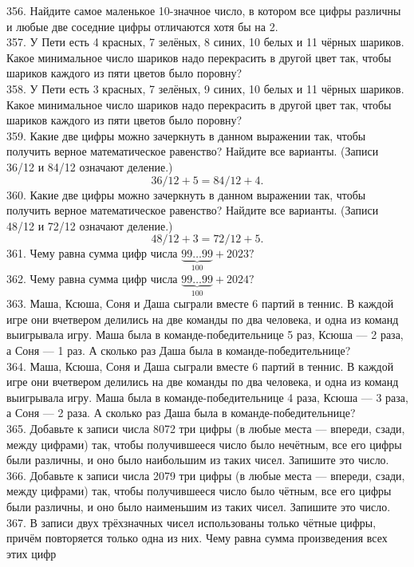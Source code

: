356. Найдите самое маленькое 10-значное число, в котором все цифры различны и любые две соседние цифры отличаются хотя бы на 2.\\
357. У Пети есть 4 красных, 7 зелёных, 8 синих, 10 белых и 11 чёрных шариков. Какое минимальное число шариков надо перекрасить в другой цвет так, чтобы шариков каждого из пяти цветов было поровну?\\
358. У Пети есть 3 красных, 7 зелёных, 9 синих, 10 белых и 11 чёрных шариков. Какое минимальное число шариков надо перекрасить в другой цвет так, чтобы шариков каждого из пяти цветов было поровну?\\
359. Какие две цифры можно зачеркнуть в данном выражении так, чтобы получить верное математическое равенство? Найдите все варианты. (Записи 36/12 и 84/12 означают деление.)
$$ 36/12+5=84/12+4.$$
360. Какие две цифры можно зачеркнуть в данном выражении так, чтобы получить верное математическое равенство? Найдите все варианты. (Записи 48/12 и 72/12 означают деление.)
$$48/12+3=72/12+5.$$
361. Чему равна сумма цифр числа $\underbrace{99\ldots99}_{100}+2023?$\\
362. Чему равна сумма цифр числа $\underbrace{99\ldots99}_{100}+2024?$\\
363. Маша, Ксюша, Соня и Даша сыграли вместе 6 партий в теннис. В каждой игре они вчетвером делились на две команды по два человека, и одна из команд выигрывала игру. Маша была в команде-победительнице 5 раз, Ксюша --- 2 раза, а Соня --- 1 раз. А сколько раз Даша была в команде-победительнице?\\
364. Маша, Ксюша, Соня и Даша сыграли вместе 6 партий в теннис. В каждой игре они вчетвером делились на две команды по два человека, и одна из команд выигрывала игру. Маша была в команде-победительнице 4 раза, Ксюша --- 3 раза, а Соня --- 2 раза. А сколько раз Даша была в команде-победительнице?\\
365. Добавьте к записи числа 8072 три цифры (в любые места --- впереди, сзади, между цифрами) так, чтобы получившееся число было нечётным, все его цифры были различны, и оно было наибольшим из таких чисел. Запишите это число.\\
366. Добавьте к записи числа 2079 три цифры (в любые места --- впереди, сзади, между цифрами) так, чтобы получившееся число было чётным, все его цифры были различны, и оно было наименьшим из таких чисел. Запишите это число.\\
367. В записи двух трёхзначных чисел использованы только чётные цифры, причём повторяется только одна из них. Чему равна сумма произведения всех этих цифр
